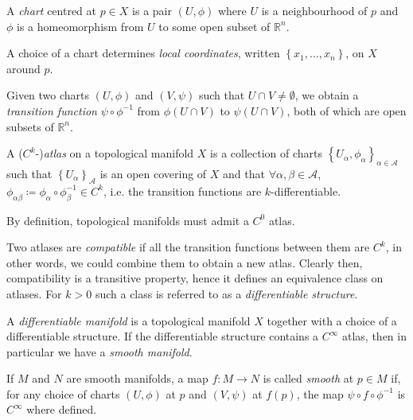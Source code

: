 \documentclass[fleqn, 11pt]{report}
\begin{document}
\begin{definition}[Chart]
	A \textsl{chart} centred at $ p \in X $ is a pair $ \left( U, \phi \right) $ where $ U $ is a neighbourhood of $ p $ and $ \phi $ is a homeomorphism from $ U $ to some open subset of $ \mathbb{R}^n $.
\end{definition}

\begin{remark}
	A choice of a chart determines \textsl{local coordinates}, written $ \left\{ x_1, \ldots, x_n \right\} $, on $ X $ around $ p $.
\end{remark}

Given two charts $ (U, \phi) $ and $ (V, \psi) $ such that $ U \cap V \neq \emptyset $, we obtain a \textsl{transition function} $ \psi \circ \phi^{-1} $ from $ \phi(U \cap V) $ to $ \psi(U \cap V) $, both of which are open subsets of $ \mathbb{R}^n $.

\begin{definition}[Atlas]
	A ($ C^k $-)\textsl{atlas} on a topological manifold $ X $ is a collection of charts $ \left\{ U_\alpha, \phi_\alpha \right\}_{\alpha \in \mathcal{A}} $ such that $ \left\{ U_\alpha \right\}_\mathcal{A} $ is an open covering of $ X $ and that $ \forall \alpha, \beta \in \mathcal{A} $, ${ \phi_{\alpha\beta} \coloneqq \phi_\alpha \circ \phi_\beta^{{-1}} \in C^k }$, i.e. the transition functions are $ k $-differentiable.
\end{definition}

\begin{remark}
	By definition, topological manifolds must admit a $ C^0 $ atlas.
\end{remark}

Two atlases are \textsl{compatible} if all the transition functions between them are $ C^k $, in other words, we could combine them to obtain a new atlas. Clearly then, compatibility is a transitive property, hence it defines an equivalence class on atlases. For $ k > 0 $ such a class is referred to as a \textsl{differentiable structure}.

\begin{definition}
	A \textsl{differentiable manifold} is a topological manifold $ X $ together with a choice of a differentiable structure. If the differentiable structure contains a $ C^\infty $ atlas, then in particular we have a \textsl{smooth manifold}.
\end{definition}

\begin{definition}
	If $ M $ and $ N $ are smooth manifolds, a map $ f: M \to N $ is called \textsl{smooth} at $ p \in M $ if, for any choice of charts $ (U, \phi) $ at $ p $ and $ (V, \psi) $ at $ f(p) $, the map $ \psi \circ f \circ \phi^{-1} $ is $ C^\infty $ where defined.
\end{definition}
\end{document}
